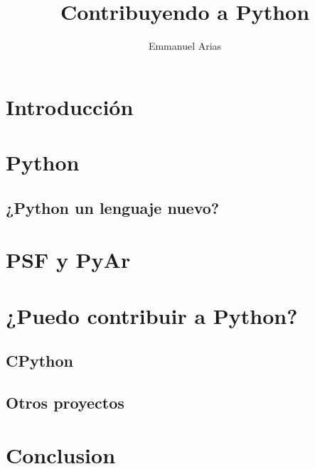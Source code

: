 \documentclass[12pt,a4paper,titlepage]{article}
\title{Contribuyendo a Python}
\author{Emmanuel Arias}
\begin{document}
\maketitle

\begin{abstract}

\end{abstract}
\tableofcontents

\newpage

\section{Introducción}

\section{Python}

\subsection{¿Python un lenguaje nuevo?}

\section{PSF y PyAr}

\section{¿Puedo contribuir a Python?}

\subsection{CPython}

\subsection{Otros proyectos}

\section{Conclusion}
\end{document}
